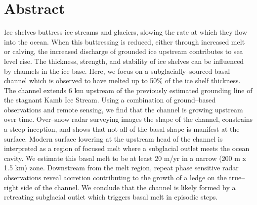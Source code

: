 \label{ch:data}




\section{Abstract}

Ice shelves buttress ice streams and glaciers, slowing the rate at which they flow into the ocean. When this buttressing is reduced, either through increased melt or calving, the increased discharge of grounded ice upstream contributes to sea level rise. The thickness, strength, and stability of ice shelves can be influenced by channels in the ice base.
Here, we focus on a subglacially--sourced basal channel which is observed to have melted up to 50\% of the ice shelf thickness. The channel extends 6 km upstream of the previously estimated grounding line of the stagnant Kamb Ice Stream. Using a combination of ground--based observations and remote sensing, we find that the channel is growing upstream over time.  Over--snow radar surveying images the shape of the channel, constrains a steep inception, and shows that not all of the basal shape is manifest at the surface.  Modern surface lowering at the upstream head of the channel is interpreted as a region of focused melt where a subglacial outlet meets the ocean cavity. We estimate this basal melt to be at least 20 m/yr in a narrow (200 m x 1.5 km) zone. Downstream from the melt region, repeat phase sensitive radar observations reveal accretion contributing to the growth of a ledge on the true--right side of the channel. 
We conclude that the channel is likely formed by a retreating subglacial outlet which triggers basal melt in episodic steps.



